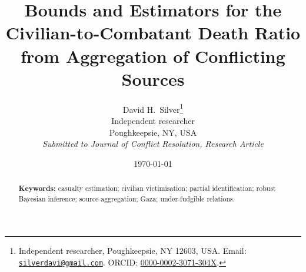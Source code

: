 \documentclass[12pt,a4paper]{article}
\title{\textbf{Bounds and Estimators for the Civilian-to-Combatant Death Ratio\\ from Aggregation of Conflicting Sources}}
\author{%
  David H.\ Silver\thanks{Independent researcher, Poughkeepsie, NY 12603, USA. Email: \href{mailto:silverdavi@gmail.com}{\texttt{silverdavi@gmail.com}}. ORCID: \href{https://orcid.org/0000-0002-3071-304X}{0000-0002-3071-304X}.}\\
  \small Independent researcher\\
  \small Poughkeepsie, NY, USA\\[2pt]
  \small\emph{Submitted to Journal of Conflict Resolution, Research Article}}
\date{\today}
\theoremstyle{plain}
\theoremstyle{definition}
\theoremstyle{remark}
\begin{document}
\maketitle

\begin{abstract}


\bigskip
\noindent\textbf{Keywords:} casualty estimation; civilian victimisation; partial identification; robust Bayesian inference; source aggregation; Gaza; under-fudgible relations.
\end{abstract}











\end{document}
